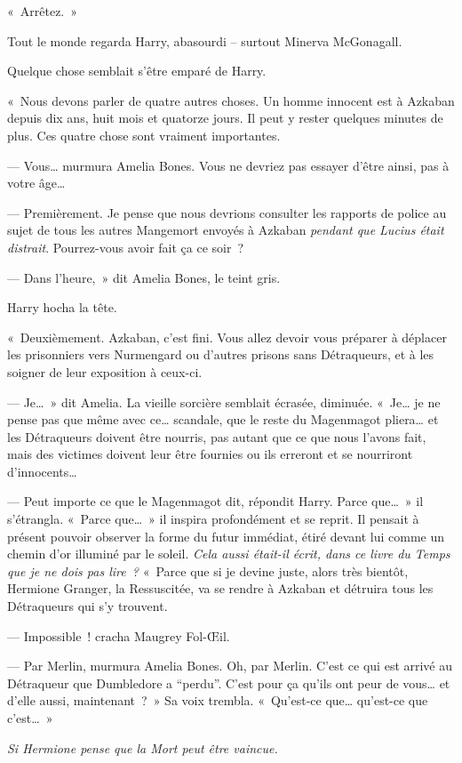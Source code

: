 «~Arrêtez.~»

Tout le monde regarda Harry, abasourdi -- surtout Minerva McGonagall.

Quelque chose semblait s'être emparé de Harry.

«~Nous devons parler de quatre autres choses.
Un homme innocent est à Azkaban depuis dix ans, huit mois et quatorze jours.
Il peut y rester quelques minutes de plus.
Ces quatre chose sont vraiment importantes.

--- Vous… murmura Amelia Bones.
Vous ne devriez pas essayer d'être ainsi, pas à votre âge…

--- Premièrement.
Je pense que nous devrions consulter les rapports de police au sujet de tous les autres Mangemort envoyés à Azkaban \emph{pendant que Lucius était distrait}.
Pourrez-vous avoir fait ça ce soir~?

--- Dans l'heure,~» dit Amelia Bones, le teint gris.

Harry hocha la tête.

«~Deuxièmement.
Azkaban, c'est fini.
Vous allez devoir vous préparer à déplacer les prisonniers vers Nurmengard ou d'autres prisons sans Détraqueurs, et à les soigner de leur exposition à ceux-ci.

--- Je…~» dit Amelia.
La vieille sorcière semblait écrasée, diminuée.
«~Je… je ne pense pas que même avec ce… scandale, que le reste du Magenmagot pliera… et les Détraqueurs doivent être nourris, pas autant que ce que nous l'avons fait, mais des victimes doivent leur être fournies ou ils erreront et se nourriront d'innocents…

--- Peut importe ce que le Magenmagot dit, répondit Harry.
Parce que…~»
il s'étrangla.
«~Parce que…~»
il inspira profondément et se reprit.
Il pensait à présent pouvoir observer la forme du futur immédiat, étiré devant lui comme un chemin d'or illuminé par le soleil.
\emph{Cela aussi était-il écrit, dans ce livre du Temps que je ne dois pas lire~?} «~Parce que si je devine juste, alors très bientôt, Hermione Granger, la Ressuscitée, va se rendre à Azkaban et détruira tous les Détraqueurs qui s'y trouvent.

--- Impossible~! cracha Maugrey Fol-Œil.

--- Par Merlin, murmura Amelia Bones.
Oh, par Merlin.
C'est ce qui est arrivé au Détraqueur que Dumbledore a “perdu”.
C'est pour ça qu'ils ont peur de vous… et d'elle aussi, maintenant~?~»
Sa voix trembla.
«~Qu'est-ce que… qu'est-ce que c'est…~»

\emph{Si Hermione pense que la Mort peut être vaincue.}

